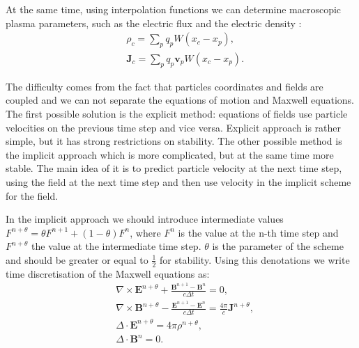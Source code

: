 At the same time, using interpolation functions we can determine macroscopic plasma parameters, such as the electric flux and the electric density :
\begin{equation}
\begin{aligned}\label{rhoj}
&\rho_c=\sum_p q_p W \left(x_{{c}} - x_{{p}} \right),
\\
&\textbf{J}_c=\sum_p q_p \textbf{v}_p W \left(x_{{c}} - x_{{p}} \right).
\end{aligned}
\end{equation}

The difficulty comes from the fact that particles coordinates and fields are coupled and we can not separate the equations of motion and Maxwell equations. The first possible solution is the explicit method: equations of fields use particle velocities on the previous time step and vice versa. Explicit approach is rather simple, but it has strong restrictions on stability. The other possible method is the implicit approach which is more complicated, but at the same time more stable. The main idea of it is to predict particle velocity at the next time step, using the field at the next time step and then use velocity in the implicit scheme for the field.

In the implicit approach we should introduce intermediate values $F^{n+\theta}=\theta F^{n+1} + \left(1-\theta\right) F^n$, where $F^n$ is the value at the n-th time step and $F^{n+\theta}$ the value at the intermediate time step. $\theta$ is the parameter of the scheme and should be greater or equal to $\frac{1}{2}$ for stability. Using this denotations we write time discretisation of the Maxwell equations as:
\begin{equation}
\begin{aligned}\label{maxwell}
&\nabla\times\textbf{E}^{n+\theta}+\frac{\textbf{B}^{n+1}-\textbf{B}^n}{c\Delta t}=0,
\\
&\nabla\times\textbf{B}^{n+\theta}-\frac{\textbf{E}^{n+1}-\textbf{E}^n}{c\Delta t}=\frac{4\pi}{c}\textbf{J}^{n+\theta},
\\
&\Delta\cdot\textbf{E}^{n+\theta}=4\pi\rho^{n+\theta},
\\
&\Delta\cdot\textbf{B}^n=0.
\end{aligned}
\end{equation}

